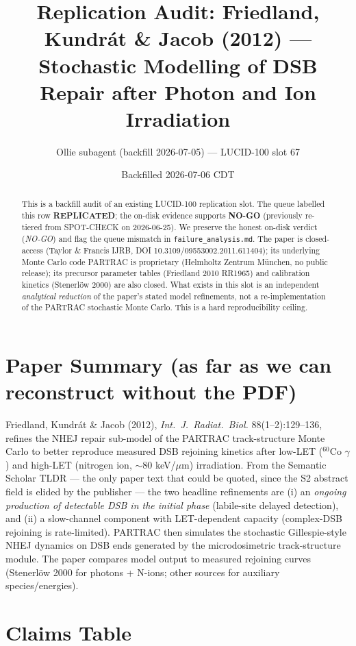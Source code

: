 \documentclass[11pt]{article}
\title{Replication Audit: Friedland, Kundr\'at \& Jacob (2012) --- Stochastic
Modelling of DSB Repair after Photon and Ion Irradiation}
\author{Ollie subagent (backfill 2026-07-05) --- LUCID-100 slot 67}
\date{Backfilled 2026-07-06 CDT}
\begin{document}
\maketitle

\begin{abstract}
This is a backfill audit of an existing LUCID-100 replication slot. The queue
labelled this row \textbf{REPLICATED}; the on-disk evidence supports
\textbf{NO-GO} (previously re-tiered from SPOT-CHECK on 2026-06-25).  We
preserve the honest on-disk verdict (\emph{NO-GO}) and flag the queue mismatch
in \texttt{failure\_analysis.md}. The paper is closed-access (Taylor \& Francis
IJRB, DOI 10.3109/09553002.2011.611404); its underlying Monte Carlo code
PARTRAC is proprietary (Helmholtz Zentrum M\"unchen, no public release); its
precursor parameter tables (Friedland 2010 RR1965) and calibration kinetics
(Stenerl\"ow 2000) are also closed. What exists in this slot is an independent
\emph{analytical reduction} of the paper's stated model refinements, not a
re-implementation of the PARTRAC stochastic Monte Carlo. This is a hard
reproducibility ceiling.
\end{abstract}

\section{Paper Summary (as far as we can reconstruct without the PDF)}

Friedland, Kundr\'at \& Jacob (2012), \emph{Int.\ J.\ Radiat.\ Biol.}
88(1--2):129--136, refines the NHEJ repair sub-model of the PARTRAC
track-structure Monte Carlo to better reproduce measured DSB rejoining
kinetics after low-LET ($^{60}$Co $\gamma$) and high-LET (nitrogen ion,
$\sim$80 keV/$\mu$m) irradiation. From the Semantic Scholar TLDR --- the only
paper text that could be quoted, since the S2 abstract field is elided by the
publisher --- the two headline refinements are (i) an \emph{ongoing
production of detectable DSB in the initial phase} (labile-site delayed
detection), and (ii) a slow-channel component with LET-dependent capacity
(complex-DSB rejoining is rate-limited). PARTRAC then simulates the
stochastic Gillespie-style NHEJ dynamics on DSB ends generated by the
microdosimetric track-structure module. The paper compares model output to
measured rejoining curves (Stenerl\"ow 2000 for photons + N-ions; other
sources for auxiliary species/energies).

\section{Claims Table}
\end{document}
